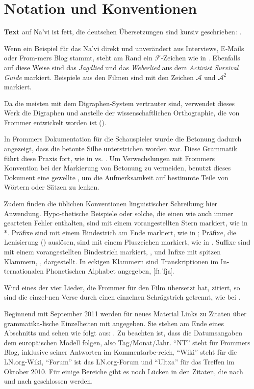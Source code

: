 \section{Notation und Konventionen}

\textbf{Text} auf Na'vi ist fett, die deutschen Übersetzungen sind kursiv geschrieben:  .

Wenn ein Beispiel für das Na'vi direkt und unverändert aus Interviews, E-Mails oder From-mers Blog stammt, steht am Rand ein $\mathcal{F}$-Zeichen wie in . Ebenfalls auf diese Weise sind das \textit{Jagdlied} und das \textit{Weberlied} aus dem \textit{Activist Survival Guide} markiert. Beispiele aus den Filmen sind mit den Zeichen $\mathcal{A}$ und $\mathcal{A}^2$ markiert.

Da die meisten mit dem Digraphen-System vertrauter sind, verwendet dieses Werk die Digraphen  und  anstelle der wissenschaftlichen Orthographie, die von Frommer entwickelt worden ist ().

In Frommers Dokumentation für die Schauspieler wurde die Betonung dadurch angezeigt, dass die betonte Silbe unterstrichen worden war. Diese Grammatik führt diese Praxis fort, wie in   vs.  . Um Verwechslungen mit Frommers Konvention bei der Markierung von Betonung zu vermeiden, benutzt dieses Dokument eine gewellte , um die Aufmerksamkeit auf bestimmte Teile von Wörtern oder Sätzen zu lenken.

Zudem finden die üblichen Konventionen linguistischer Schreibung hier Anwendung. Hypo-thetische Beispiele oder solche, die einen wie auch immer gearteten Fehler enthalten, sind mit einem vorangestellten Stern markiert, wie in *. Präfixe sind mit einem Bindestrich am Ende markiert, wie in ; Präfixe, die Lenisierung () auslösen, sind mit einem Pluszeichen markiert, wie in . Suffixe sind mit einem vorangestellten Bindestrich markiert, , und Infixe mit spitzen Klammern, , dargestellt. In eckigen Klammern sind Transkriptionen im In-ternationalen Phonetischen Alphabet angegeben, [fɪ.ˈfja].

Wird eines der vier Lieder, die Frommer für den Film übersetzt hat, zitiert, so sind die einzel-nen Verse durch einen einzelnen Schrägstrich getrennt, wie bei .

Beginnend mit September 2011 werden für neues Material Links zu Zitaten über grammatika-lische Einzelheiten mit angegeben. Sie stehen am Ende eines Abschnitts und sehen wie folgt aus: . Zu beachten ist, dass die Datumsangaben dem europäischen Modell folgen, also Tag/Monat/Jahr. ``NT'' steht für Frommers Blog, inklusive seiner Antworten im Kommentarbe-reich, ``Wiki'' steht für die LN.org-Wiki, ``Forum'' ist das LN.org-Forum und ``Ultxa'' für das Treffen im Oktober 2010. Für einige Bereiche gibt es noch Lücken in den Zitaten, die nach und nach geschlossen werden.

